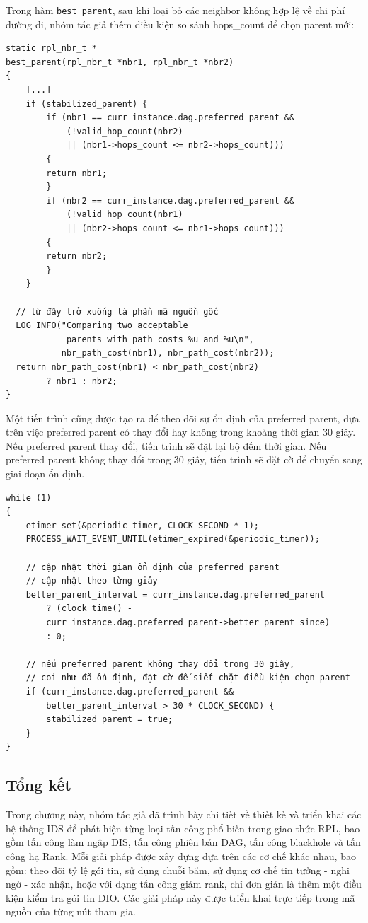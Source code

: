 Trong hàm \texttt{best\_parent}, sau khi loại bỏ các neighbor không hợp lệ về chi phí đường đi, nhóm tác giả thêm điều kiện so sánh hops\_count để chọn parent mới:
\begin{verbatim}
static rpl_nbr_t *
best_parent(rpl_nbr_t *nbr1, rpl_nbr_t *nbr2)
{
    [...]
    if (stabilized_parent) {
        if (nbr1 == curr_instance.dag.preferred_parent &&
            (!valid_hop_count(nbr2) 
            || (nbr1->hops_count <= nbr2->hops_count)))
        {
        return nbr1;
        }
        if (nbr2 == curr_instance.dag.preferred_parent &&
            (!valid_hop_count(nbr1) 
            || (nbr2->hops_count <= nbr1->hops_count))) 
        {
        return nbr2;
        }
    }

  // từ đây trở xuống là phần mã nguồn gốc
  LOG_INFO("Comparing two acceptable 
            parents with path costs %u and %u\n",
           nbr_path_cost(nbr1), nbr_path_cost(nbr2));
  return nbr_path_cost(nbr1) < nbr_path_cost(nbr2) 
        ? nbr1 : nbr2;
}
\end{verbatim}

Một tiến trình cũng được tạo ra để theo dõi sự ổn định của preferred parent, dựa trên việc preferred parent có thay đổi hay không trong khoảng thời gian 30 giây. Nếu preferred parent thay đổi, tiến trình sẽ đặt lại bộ đếm thời gian. Nếu preferred parent không thay đổi trong 30 giây, tiến trình sẽ đặt cờ để chuyển sang giai đoạn ổn định.

\begin{verbatim}
while (1)
{
    etimer_set(&periodic_timer, CLOCK_SECOND * 1);
    PROCESS_WAIT_EVENT_UNTIL(etimer_expired(&periodic_timer));

    // cập nhật thời gian ổn định của preferred parent
    // cập nhật theo từng giây
    better_parent_interval = curr_instance.dag.preferred_parent 
        ? (clock_time() - 
        curr_instance.dag.preferred_parent->better_parent_since) 
        : 0;
    
    // nếu preferred parent không thay đổi trong 30 giây,
    // coi như đã ổn định, đặt cờ để siết chặt điều kiện chọn parent
    if (curr_instance.dag.preferred_parent && 
        better_parent_interval > 30 * CLOCK_SECOND) {
        stabilized_parent = true;
    }
}
\end{verbatim}

\subsection{Tổng kết}
Trong chương này, nhóm tác giả đã trình bày chi tiết về thiết kế và triển khai các hệ thống IDS để phát hiện từng loại tấn công phổ biến trong giao thức RPL, bao gồm tấn công làm ngập DIS, tấn công phiên bản DAG, tấn công blackhole và tấn công hạ Rank. Mỗi giải pháp được xây dựng dựa trên các cơ chế khác nhau, bao gồm: theo dõi tỷ lệ gói tin, sử dụng chuỗi băm, sử dụng cơ chế tin tưởng - nghi ngờ - xác nhận, hoặc với dạng tấn công giảm rank, chỉ đơn giản là thêm một điều kiện kiểm tra gói tin DIO. Các giải pháp này được triển khai trực tiếp trong mã nguồn của từng nút tham gia.
